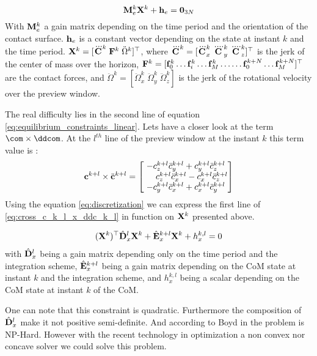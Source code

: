 \begin{appendix}
\begin{equation}
{\bf M}^k_{e} {\bf X}^k+{\bf h}_e = {\bf 0}_{3N}
\end{equation}
%
With $ {\bf M}^k_{e} $ a gain matrix depending on the time period and the orientation of the contact surface. $ {\bf h}_e $ is a constant vector depending on the state at instant $k$ and the time period.
${\bf X}^k = [ \dddot{\bf C}^k \; {\bf F}^k \; \ddot{\Omega}^k ]^{\top}$, where
$ \dddot{\bf C}^k = [\dddot{\bf C}^k_x \; \ddddot{\bf C}^k_y \; \ddddot{\bf C}^k_z ]^{\top}$ is the jerk of the center of mass over
the horizon,
${\bf F}^k= [ {\bf f}^k_0 \dots {\bf f}^k_i \dots {\bf f}^k_M \dots \dots {\bf f}^{k+N}_0 \dots {\bf f}^{k+N}_M ]^{\top}$ are the contact forces, and $\ddot{\Omega}^k=[\ddot{\Omega}_x^k \; \ddot{\Omega}_y^k \; \ddot{\Omega}_z^k] $ is the jerk of the rotational velocity over the preview window.

The real difficulty lies in the second line of equation \eqref{eq:equilibrium_constraints_linear}. Lets have a closer look at the term $ \com \times \ddcom $.
At the $l^{th}$ line of the preview window at the instant $k$ this term value is :
\begin{equation}
 {\bf c}^{k+l} \times \ddot{\bf c}^{k+l}=
\left[
  \begin{matrix}
    -c^{k+l}_z \ddot{c}^{k+l}_y + c^{k+l}_y \ddot{c}^{k+l}_z \\
    \;\;\;\;\;c^{k+l}_z \ddot{c}^{k+l}_x - c^{k+l}_x \ddot{c}^{k+l}_z \\
    -c^{k+l}_y \ddot{c}^{k+l}_x + c^{k+l}_x \ddot{c}^{k+l}_y \\
  \end{matrix}
\right]
\label{eq:cross_c_k_l_x_ddc_k_l}
\end{equation}
Using the equation \eqref{eq:discretization} we can express the first line of \eqref{eq:cross_c_k_l_x_ddc_k_l} in function on $ {\bf X}^k $ presented above.

\begin{align}
({\bf X}^k)^{\top} \hat{\bf D}_x^l {\bf X}^k +
%
\hat{\bf E}_x^{k+l} {\bf X}^k +
%
h_x^{k,l} =  0
\label{eq:quadratic_equality_constraint}
\end{align}
with
$ \hat{\bf D}_x^l $ being a gain matrix depending only on the time period and the integration scheme,
$ \hat{\bf E}_x^{k+l} $ being a gain matrix depending on the CoM state at instant $k$ and the integration scheme, and
$ h_x^{k,l} $ being a scalar depending on the CoM state at instant $k$ of the CoM.

One can note that this constraint is quadratic. Furthermore the composition of $ \hat{\bf D}_x^l $ make it not positive semi-definite. And according to Boyd in \cite{boyd:tro:07} the problem is NP-Hard.
However with the recent technology in optimization a non convex nor concave solver we could solve this problem.


\end{appendix}
